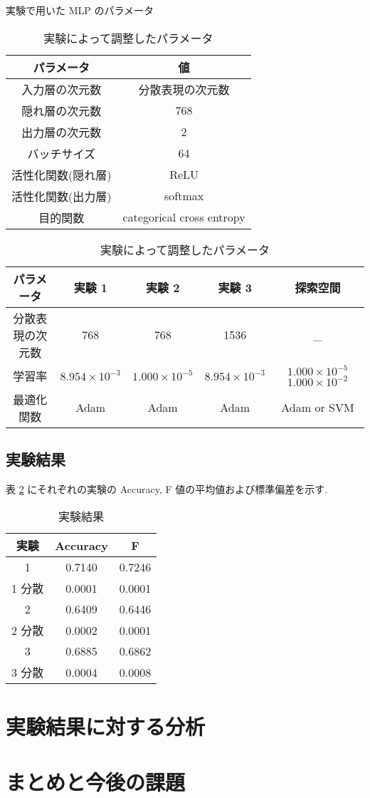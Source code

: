 \documentclass[twocolumn]{jarticle}     %
\begin{document}
\begin{table}[t] %
	\begin{center}
		\caption{実験で用いた MLP のパラメータ}
		\label{mlph}
		\small
		\begin{tabular}{|c|c|} \hline
			パラメータ			& 値						\\ \hline \hline
			入力層の次元数			& 分散表現の次元数 \\ \hline
			隠れ層の次元数      	& 768				\\ \hline
			出力層の次元数			& 2 						\\ \hline
			バッチサイズ			& 64 						\\ \hline
			活性化関数(隠れ層)		& ReLU 					\\ \hline
			活性化関数(出力層)		& softmax 				\\ \hline
			目的関数				& categorical cross entropy 	\\ \hline
		\end{tabular}
	\end{center}
	\begin{center}
		\caption{実験によって調整したパラメータ}
		\label{optu1}
		\small
		\begin{tabular}{|c|c|c|c|c|} \hline
            パラメータ			 & 実験 1 & 実験 2 & 実験 3 &探索空間 \\ \hline \hline
            分散表現の次元数    & 768 & 768 & 1536 & _ \\ \hline
			学習率				& $8.954 \times 10^{-3}$ & $1.000 \times 10^{-5}$& $8.954 \times 10^{-3}$ & $1.000 \times 10^{-5}$  $1.000 \times 10^{-2}$  \\ \hline
			最適化関数			& Adam & Adam & Adam &Adam or SVM \\ \hline
		\end{tabular}
	\end{center}

\end{table}

\subsection{実験結果}
表 \ref{} にそれぞれの実験の Accuracy, F 値の平均値および標準偏差を示す. 
\begin{table}[ht] %
	\begin{center}
		\caption{実験結果}
		\label{data}
		\begin{tabular}{|c|c|c|}
			\hline
			実験 &Accuracy& F \\ \hline \hline
			1  & 0.7140 & 0.7246  \\ \hline
			1 分散 & 0.0001 & 0.0001  \\ \hline
			2  & 0.6409 & 0.6446 \\ \hline
			2 分散 & 0.0002 & 0.0001  \\ \hline
			3  & 0.6885 & 0.6862\\ \hline
			3 分散 & 0.0004 & 0.0008  \\ \hline
		\end{tabular}
	\end{center}
\end{table}
\section{実験結果に対する分析}
\section{まとめと今後の課題} 


\end{document}

